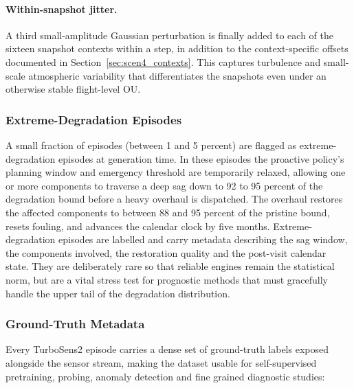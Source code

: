\paragraph{Within-snapshot jitter.}
A third small-amplitude Gaussian perturbation is finally added to
each of the sixteen snapshot contexts within a step, in addition to
the context-specific offsets documented in
Section~\ref{sec:scen4_contexts}. This captures turbulence and
small-scale atmospheric variability that differentiates the snapshots
even under an otherwise stable flight-level OU.

\subsubsection{Extreme-Degradation Episodes}
\label{sec:scen4_extreme}

A small fraction of episodes (between 1 and 5 percent)
are flagged as extreme-degradation episodes at generation time.
In these episodes the proactive policy's planning window and
emergency threshold are temporarily relaxed, allowing one or more
components to traverse a deep sag down to 92 to 95 percent of the
degradation bound before a heavy overhaul is dispatched. The overhaul
restores the affected components to between 88 and 95 percent of the
pristine bound, resets fouling, and advances the calendar clock
by five months. Extreme-degradation episodes are labelled and carry
metadata describing the sag window, the components involved, the
restoration quality and the post-visit calendar state. They are
deliberately rare so that reliable engines remain the statistical
norm, but are a vital stress test for prognostic methods that must
gracefully handle the upper tail of the degradation distribution.

\subsubsection{Ground-Truth Metadata}
\label{sec:scen4_metadata}

Every TurboSens2 episode carries a dense set of ground-truth labels
exposed alongside the sensor stream, making the dataset usable for
self-supervised pretraining, probing, anomaly detection and fine
grained diagnostic studies:


